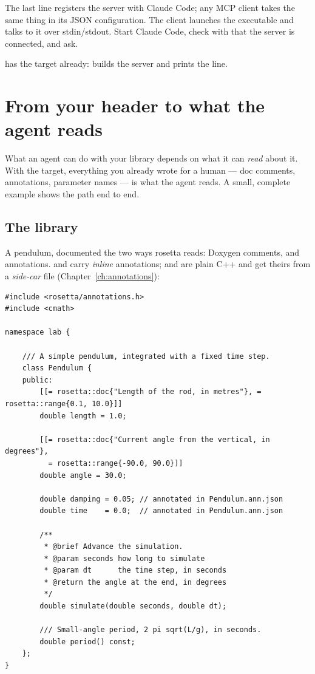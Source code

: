 The last line registers the server with Claude Code; any MCP client takes the
same thing in its JSON configuration. The client launches the executable and
talks to it over stdin/stdout. Start Claude Code, check with  that
the server is connected, and ask.

\begin{note}
 has the target already:  builds the
server and prints the  line.
\end{note}

\section{From your header to what the agent reads}
\label{sec:mcp-header}

What an agent can do with your library depends on what it can \emph{read} about
it. With the  target, everything you already wrote for a human ---
doc comments, annotations, parameter names --- is what the agent reads. A small,
complete example shows the path end to end.

\subsection*{The library}

A pendulum, documented the two ways rosetta reads: Doxygen comments, and
annotations.  and  carry \emph{inline} annotations;
 and  are plain C++ and get theirs from a
\emph{side-car} file (Chapter~\ref{ch:annotations}):

\begin{lstlisting}[style=cpp]
#include <rosetta/annotations.h>
#include <cmath>

namespace lab {

    /// A simple pendulum, integrated with a fixed time step.
    class Pendulum {
    public:
        [[= rosetta::doc{"Length of the rod, in metres"}, = rosetta::range{0.1, 10.0}]]
        double length = 1.0;

        [[= rosetta::doc{"Current angle from the vertical, in degrees"},
          = rosetta::range{-90.0, 90.0}]]
        double angle = 30.0;

        double damping = 0.05; // annotated in Pendulum.ann.json
        double time    = 0.0;  // annotated in Pendulum.ann.json

        /**
         * @brief Advance the simulation.
         * @param seconds how long to simulate
         * @param dt      the time step, in seconds
         * @return the angle at the end, in degrees
         */
        double simulate(double seconds, double dt);

        /// Small-angle period, 2 pi sqrt(L/g), in seconds.
        double period() const;
    };
}
\end{lstlisting}

